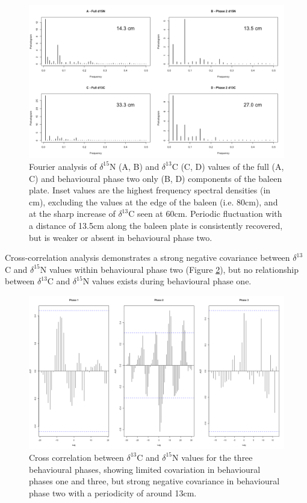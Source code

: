 \documentclass[a4paper,10pt]{article}
\begin{document}
\begin{figure}[!htbp]
  \centering
  \includegraphics[width = \linewidth]{figures/Figure-S1-periodograms.png}
  \caption{Fourier analysis of $\delta^{15}$N (A, B) and $\delta^{13}$C (C, D) values of the full (A, C) and behavioural phase two only (B, D) components of the baleen plate. Inset values are the highest frequency spectral densities (in cm), excluding the values at the edge of the baleen (i.e. 80cm), and at the sharp increase of $\delta^{13}$C seen at 60cm. Periodic fluctuation with a distance of 13.5cm along the baleen plate is consistently recovered, but is weaker or absent in behavioural phase two.} 
  \label{figs1}
\end{figure}
 
Cross-correlation analysis demonstrates a strong negative covariance between $\delta^{13}$C and $\delta^{15}$N  values within behavioural phase two (Figure \ref{figs2}), but no relationship between $\delta^{13}$C and $\delta^{15}$N values exists during behavioural phase one.

\begin{figure}[!htbp]
  \centering
  \includegraphics[width = \linewidth]{figures/Figure-S2-cross-cor.png}
  \caption{Cross correlation between $\delta^{13}$C and $\delta^{15}$N values for the three behavioural phases, showing limited covariation in behavioural phases one and three, but strong negative covariance in behavioural phase two with a periodicity of around 13cm.
  }
  \label{figs2}
\end{figure}
 
\end{document}
